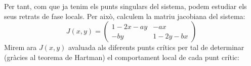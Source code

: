 \documentclass{article}
\begin{document}
\noindent Per tant, com que ja tenim els punts singulars del sistema, podem estudiar els seus retrats de fase locals. Per això, calculem la matriu jacobiana del sistema:
\begin{equation}
  J(x,y)=
  \begin{pmatrix}
    1-2x-ay & -ax      \\
    -by     & 1-2y-bx 
  \end{pmatrix}
\end{equation}
Mirem ara $J(x,y)$ avaluada als diferents punts crítics per tal de determinar (gràcies al teorema de Hartman) el comportament local de cada punt crític:
\end{document}
